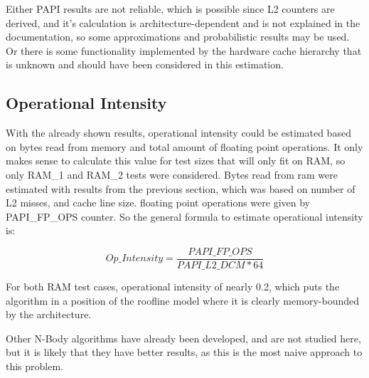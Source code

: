 \documentclass[twocolumn,10pt]{scrartcl}
\begin{document}
Either PAPI results are not reliable, which is possible since L2 counters are derived, and it's calculation is architecture-dependent and is not explained in the documentation, so some approximations and probabilistic results may be used. Or there is some functionality implemented by the hardware cache hierarchy that is unknown and should have been considered in this estimation.

\subsection{Operational Intensity}

With the already shown results, operational intensity could be estimated based on bytes read from memory and total amount of floating point operations. It only makes sense to calculate this value for test sizes that will only fit on RAM, so only RAM\_1 and RAM\_2 tests were considered. Bytes read from ram were estimated with results from the previous section, which was based on number of L2 misses, and cache line size. floating point operations were given by PAPI\_FP\_OPS counter. So the general formula to estimate operational intensity is:

$$Op\_Intensity = \frac{PAPI\_FP\_OPS}{PAPI\_L2\_DCM * 64}$$

For both RAM test cases, operational intensity of nearly 0.2, which puts the algorithm in a position of the roofline model where it is clearly memory-bounded by the architecture.

Other N-Body algorithms have already been developed, and are not studied here, but it is likely that they have better results, as this is the most naive approach to this problem.
\end{document}
